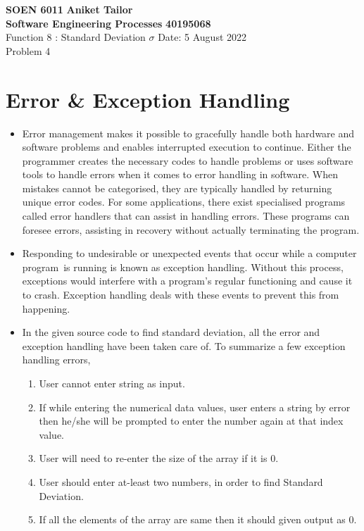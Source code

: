 \documentclass[a4paper, 12pt]{article}
\begin{document}
\noindent
\large\textbf{SOEN 6011} \hfill \textbf{Aniket Tailor}\\
\large\textbf{Software Engineering Processes} \hfill \textbf{40195068} \\
Function 8 : Standard Deviation $\sigma$ \hfill Date: 5 August 2022\\
\normalsize Problem 4 \\


\section{Error \& Exception Handling}

\begin{itemize}
    \item Error management makes it possible to gracefully handle both hardware and software problems and enables interrupted execution to continue. Either the programmer creates the necessary codes to handle problems or uses software tools to handle errors when it comes to error handling in software. When mistakes cannot be categorised, they are typically handled by returning unique error codes. For some applications, there exist specialised programs called error handlers that can assist in handling errors. These programs can foresee errors, assisting in recovery without actually terminating the program. 
    \item Responding to undesirable or unexpected events that occur while a computer program is running is known as exception handling. Without this process, exceptions would interfere with a program's regular functioning and cause it to crash. Exception handling deals with these events to prevent this from happening.
    \item In the given source code to find standard deviation, all the error and exception handling have been taken care of. To summarize a few exception handling errors, 
    \begin{enumerate}
        \item User cannot enter string as input. 
        \item If while entering the numerical data values, user enters a string by error then he/she will be prompted to enter the number again at that index value.
        \item User will need to re-enter the size of the array if it is 0.
        \item User should enter at-least two numbers, in order to find Standard Deviation.
        \item If all the elements of the array are same then it should given output as 0.
    \end{enumerate}
\end{itemize}
\end{document}
